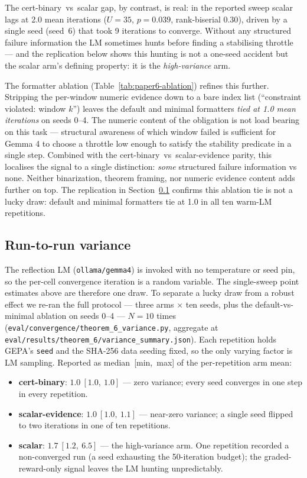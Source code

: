 The cert-binary~vs~scalar gap, by contrast, is real: in the
reported sweep scalar lags at 2.0 mean iterations ($U=35$,
$p=0.039$, rank-biserial $0.30$), driven by a single seed (seed~6)
that took 9 iterations to converge.  Without any structured failure
information the LM sometimes hunts before finding a stabilising
throttle --- and the replication below shows this hunting is not a
one-seed accident but the scalar arm's defining property: it is the
\emph{high-variance} arm.

The formatter ablation (Table~\ref{tab:paper6-ablation}) refines
this further.  Stripping the per-window numeric evidence down to a
bare index list (``constraint violated: window $k$'') leaves the
default and minimal formatters \emph{tied at 1.0 mean iterations}
on seeds 0--4.  The numeric content of the obligation is not load
bearing on this task --- structural awareness of which window
failed is sufficient for Gemma 4 to choose a throttle low enough to
satisfy the stability predicate in a single step.  Combined with
the cert-binary~vs~scalar-evidence parity, this localises the
signal to a single distinction: \emph{some} structured failure
information vs none.  Neither binarization, theorem framing, nor
numeric evidence content adds further on top.  The replication in
Section~\ref{sec:variance} confirms this ablation tie is not a lucky
draw: default and minimal formatters tie at 1.0 in all ten
warm-LM repetitions.

\subsection{Run-to-run variance}\label{sec:variance}

The reflection LM (\texttt{ollama/gemma4}) is invoked with no
temperature or seed pin, so the per-cell convergence iteration is a
random variable.  The single-sweep point estimates above are
therefore one draw.  To separate a lucky draw from a robust effect
we re-ran the full protocol --- three arms $\times$ ten seeds, plus
the default-vs-minimal ablation on seeds 0--4 --- $N=10$ times
(\texttt{eval/convergence/theorem\_6\_variance.py}, aggregate at
\texttt{eval/results/theorem\_6/variance\_summary.json}).  Each
repetition holds GEPA's \texttt{seed} and the SHA-256 data seeding
fixed, so the only varying factor is LM sampling.  Reported as
median~[min,~max] of the per-repetition arm mean:

\begin{itemize}[leftmargin=*,itemsep=2pt,topsep=2pt]
\item \textbf{cert-binary}: $1.0~[1.0,~1.0]$ --- zero variance; every
seed converges in one step in every repetition.
\item \textbf{scalar-evidence}: $1.0~[1.0,~1.1]$ --- near-zero
variance; a single seed flipped to two iterations in one of ten
repetitions.
\item \textbf{scalar}: $1.7~[1.2,~6.5]$ --- the high-variance arm.
One repetition recorded a non-converged run (a seed exhausting the
50-iteration budget); the graded-reward-only signal leaves the LM
hunting unpredictably.
\end{itemize}

